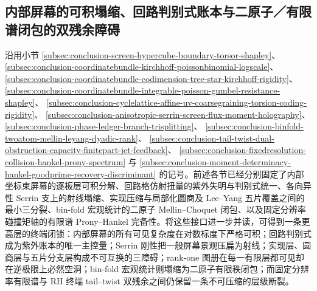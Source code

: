 \subsection{内部屏幕的可积塌缩、回路判别式账本与二原子／有限谱闭包的双残余障碍}\label{subsec:conclusion-integrable-screen-ledger-atlas-twoatom-finitespectrum-tailtwist}

沿用小节 \ref{subsec:conclusion-screen-hypercube-boundary-torsor-shapley}、
\ref{subsec:conclusion-coordinatebundle-kirchhoff-poissonbinomial-logscale}、
\ref{subsec:conclusion-coordinatebundle-codimension-tree-star-kirchhoff-rigidity}、
\ref{subsec:conclusion-coordinatebundle-integrable-poisson-gumbel-resistance-shapley}、
\ref{subsec:conclusion-cyclelattice-affine-uv-coarsegraining-torsion-coding-rigidity}、
\ref{subsec:conclusion-anisotropic-serrin-screen-flux-moment-holography}、
\ref{subsec:conclusion-phase-ledger-branch-trisplitting}、
\ref{subsec:conclusion-binfold-twoatom-mellin-leyang-dyadic-rank}、
\ref{subsec:conclusion-tail-twist-dual-obstruction-capacity-finitepart-jet-feedback}、
\ref{subsec:conclusion-fixedresolution-collision-hankel-prony-spectrum} 与
\ref{subsec:conclusion-moment-determinacy-hankel-goodprime-recovery-discriminant} 的记号。前述各节已经分别固定了内部坐标束屏幕的逐板层可积分解、回路格仿射扭量的紫外失明与判别式统一、各向异性 Serrin 支上的射线塌缩、实现压缩与局部化圆商及 Lee--Yang 五片覆盖之间的最小三分裂、bin-fold 宏观统计的二原子 Mellin--Choquet 闭包、以及固定分辨率碰撞矩轴的有限谱 Prony--Hankel 完备性。将这些接口进一步并读，可得到一条更高层的终端闭锁：内部屏幕的所有可见复杂度在对数标度下严格可积；回路判别式成为紫外账本的唯一主控量；Serrin 刚性把一般屏幕景观压扁为射线；实现层、圆商层与五片分支层构成不可互换的三障碍；rank-one 图册在每一有限层都可见却在逆极限上必然空洞；bin-fold 宏观统计则塌缩为二原子有限秩闭包；而固定分辨率有限谱与 RH 终端 tail--twist 双残余之间仍保留一条不可压缩的层级断裂。

